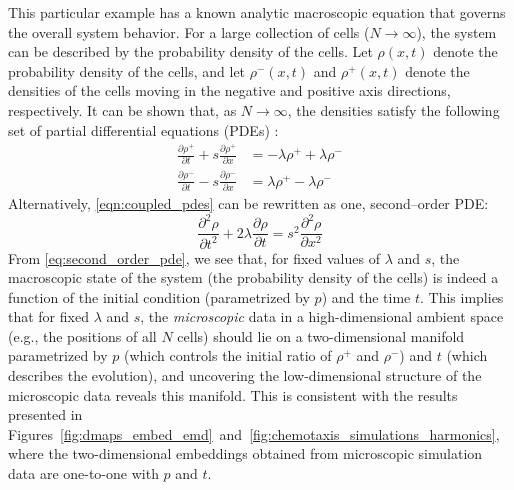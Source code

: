 This particular example has a known analytic macroscopic equation that governs the overall system behavior.
%
For a large collection of cells ($N \rightarrow \infty$), the system can be described by the probability density of the cells.
%
Let $\rho(x, t)$ denote the probability density of the cells, and let $\rho^-(x, t)$ and $\rho^+(x, t)$ denote the densities of the cells moving in the negative and positive axis directions, respectively.
%
It can be shown that, as $N \rightarrow \infty$, the densities satisfy the following set of partial differential equations (PDEs) \cite{othmer2000diffusion}:
\begin{equation} \label{eqn:coupled_pdes}
\begin{aligned}
\frac{\partial \rho^+}{\partial t} + s \frac{\partial \rho^+}{\partial x} & = -\lambda \rho^+ +\lambda \rho^- \\
\frac{\partial \rho^-}{\partial t} - s \frac{\partial \rho^-}{\partial x} & = \lambda \rho^+ -\lambda \rho^-
\end{aligned}
\end{equation}
%
Alternatively, \eqref{eqn:coupled_pdes} can be rewritten as one, second--order PDE:
\begin{equation} \label{eq:second_order_pde}
\frac{\partial^2 \rho}{\partial t^2} + 2 \lambda \frac{\partial \rho}{\partial t} = s^2 \frac{\partial ^2 \rho}{\partial x^2}
\end{equation}
%
From \eqref{eq:second_order_pde}, we see that, for fixed values of $\lambda$ and $s$, the macroscopic state of the system (the probability density of the cells) is indeed a function of the initial condition (parametrized by $p$) and the time $t$.
%
This implies that for fixed $\lambda$ and $s$, the {\em microscopic} data in a high-dimensional ambient space (e.g., the positions of all $N$ cells) should lie on a two-dimensional manifold parametrized by $p$ (which controls the initial ratio of $\rho^+$ and $\rho^-$) and $t$ (which describes the evolution),
and uncovering the low-dimensional structure of the microscopic data reveals this manifold.
%
This is consistent with the results presented in Figures~\ref{fig:dmaps_embed_emd}~and~\ref{fig:chemotaxis_simulations_harmonics}, where the two-dimensional embeddings obtained from microscopic simulation data are one-to-one with $p$ and $t$.


